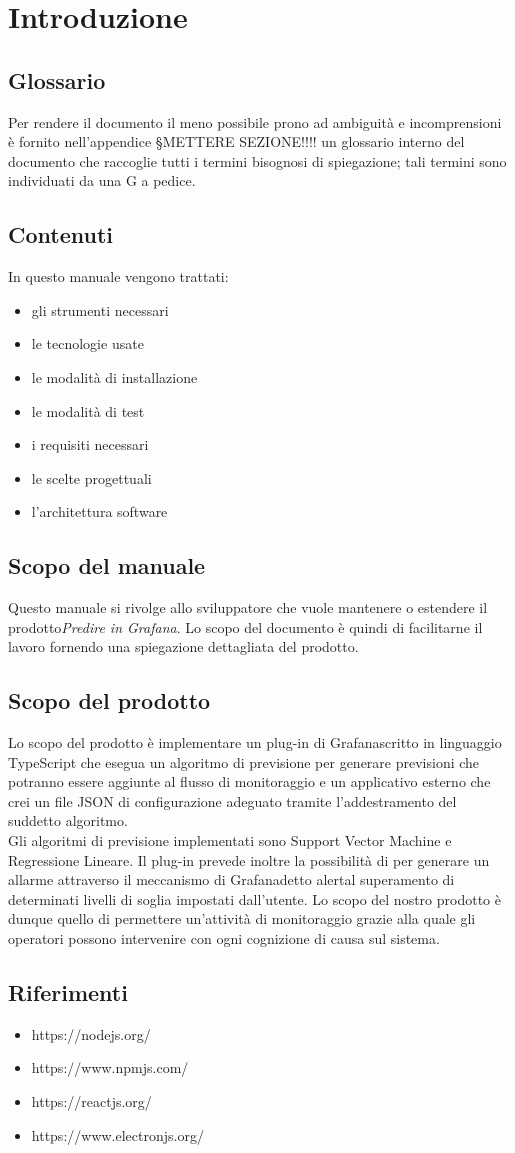 \section{Introduzione}
\subsection{Glossario}
Per rendere il documento il meno possibile prono ad ambiguità e incomprensioni è fornito nell'appendice §{METTERE SEZIONE!!!!} un glossario interno del documento che raccoglie tutti i termini bisognosi di spiegazione; tali termini sono individuati da una G a pedice.
\subsection{Contenuti}
In questo manuale vengono trattati:
\begin{itemize}
	\item gli strumenti necessari
	\item le tecnologie usate
	\item le modalità di installazione
	\item le modalità di test
	\item i requisiti necessari
	\item le scelte progettuali
	\item l'architettura software
\end{itemize}

\subsection{Scopo del manuale}
Questo manuale si rivolge allo sviluppatore che vuole mantenere o estendere il prodotto\glosp \textit{Predire in Grafana}. Lo scopo del documento è quindi di facilitarne il lavoro fornendo una spiegazione dettagliata del prodotto\glo.

\subsection{Scopo del prodotto}
Lo scopo del prodotto è implementare un plug-in di Grafana\glosp scritto in linguaggio TypeScript che esegua un algoritmo di previsione  per generare previsioni che potranno essere aggiunte al flusso di monitoraggio e un applicativo esterno che crei un file JSON di configurazione adeguato tramite l'addestramento del suddetto algoritmo. \\
Gli algoritmi di previsione implementati sono Support Vector Machine e Regressione Lineare.
Il plug-in prevede inoltre la possibilità di per generare un allarme attraverso il meccanismo di Grafana\glosp detto alert\glosp al superamento di determinati livelli di soglia impostati dall'utente.
Lo scopo del nostro prodotto è dunque quello di permettere un'attività di monitoraggio grazie alla quale gli operatori possono intervenire con ogni cognizione di causa sul sistema.

\subsection{Riferimenti}
\begin{itemize}
	\item https://nodejs.org/
	\item https://www.npmjs.com/
	\item https://reactjs.org/
	\item https://www.electronjs.org/
\end{itemize}
